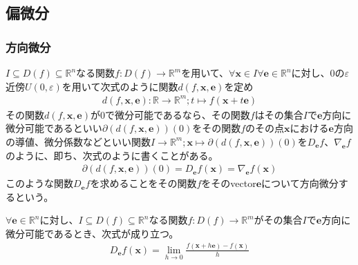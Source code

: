 \documentclass[dvipdfmx]{jsarticle}
\begin{document}
\subsection{偏微分}%
\subsubsection{方向微分}%
\begin{dfn}
$I \subseteq D(f) \subseteq \mathbb{R}^{n}$なる関数$f:D(f) \rightarrow \mathbb{R}^{m}$を用いて、$\forall\mathbf{x} \in I\forall\mathbf{e} \in \mathbb{R}^{n}$に対し、0の$\varepsilon$近傍$U(0,\varepsilon)$を用いて次式のように関数$d\left( f,\mathbf{x},\mathbf{e} \right)$を定め
\begin{align*}
d\left( f,\mathbf{x},\mathbf{e} \right):\mathbb{R} \rightarrow \mathbb{R}^{m};t \mapsto f\left( \mathbf{x} + t\mathbf{e} \right)
\end{align*}
その関数$d\left( f,\mathbf{x},\mathbf{e} \right)$が$0$で微分可能であるなら、その関数$f$はその集合$I$で$\mathbf{e}$方向に微分可能であるといい$\partial\left( d\left( f,\mathbf{x},\mathbf{e} \right) \right)(0)$をその関数$f$のその点$\mathbf{x}$における$\mathbf{e}$方向の導値、微分係数などといい関数$I \rightarrow \mathbb{R}^{m};\mathbf{x} \mapsto \partial\left( d\left( f,\mathbf{x},\mathbf{e} \right) \right)(0)$を$D_{\mathbf{e}}f$、$\nabla_{\mathbf{e}}f$のように、即ち、次式のように書くことがある。
\begin{align*}
\partial\left( d\left( f,\mathbf{x},\mathbf{e} \right) \right)(0) = D_{\mathbf{e}}f\left( \mathbf{x} \right) = \nabla_{\mathbf{e}}f\left( \mathbf{x} \right)
\end{align*}
このような関数$D_{\mathbf{e}}f$を求めることをその関数$f$をそのvector$\mathbf{e}$について方向微分するという。
\end{dfn}
\begin{thm}\label{4.2.3.1}
$\forall\mathbf{e} \in \mathbb{R}^{n}$に対し、$I \subseteq D(f) \subseteq \mathbb{R}^{n}$なる関数$f:D(f) \rightarrow \mathbb{R}^{m}$がその集合$I$で$\mathbf{e}$方向に微分可能であるとき、次式が成り立つ。
\begin{align*}
D_{\mathbf{e}}f\left( \mathbf{x} \right) = \lim_{h \rightarrow 0}\frac{f\left( \mathbf{x} + h\mathbf{e} \right) - f\left( \mathbf{x} \right)}{h}
\end{align*}
\end{thm}
\end{document}
